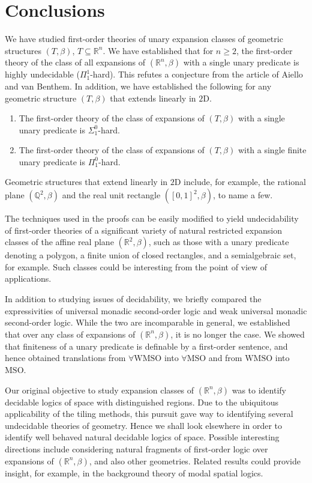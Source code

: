 \documentclass{LMCS}
\theoremstyle{plain}
\newcommand{\rp}{(\mathbb{R}^n,\beta)}
\newcommand{\rsq}{\mathbb{R}^n}
\begin{document}
\section{Conclusions}
%
%
%
We have studied first-order theories of unary expansion classes of 
%
geometric structures $(T,\beta)$, $T\subseteq\rsq$.
% 
We have established that for $n\geq 2$, the first-order theory of the class of all expansions of $\rp$ with a single unary
%
predicate is
%
highly undecidable ($\Pi_1^1$-hard). This refutes a conjecture from the article \cite{vanBenthemAiello:2002} of Aiello and van Benthem.
%
%
%
In addition, we have established the following for any geometric structure $(T,\beta)$ that extends linearly in $\mathrm{2D}$.
%
%
%
\begin{enumerate}
%
\item
The first-order theory of the class of expansions of $(T,\beta)$ with a single unary predicate is $\Sigma_1^0$-hard.
\item
The first-order theory of the class of expansions of $(T,\beta)$ with a single finite unary predicate is $\Pi_1^0$-hard.
%
\end{enumerate}
%
%
%
Geometric structures that extend linearly in $\mathrm{2D}$ include, for example, the rational plane $(\mathbb{Q}^2,\beta)$ and
%
the real unit
%
rectangle $([0,1]^2,\beta)$, to name a few.
%



%
The techniques used in the proofs can be easily modified to yield undecidability of first-order theories of a significant variety of
%
natural
%
restricted expansion classes of the affine real plane $(\mathbb{R}^2,\beta)$, such as those
%
with a unary predicate denoting a
%
 polygon, a finite union of closed rectangles, and a semialgebraic set, for example.
%
Such classes could be interesting from the point of view of applications.

In addition to studying issues of decidability, we briefly compared the expressivities of universal monadic second-order logic and
%
weak universal monadic second-order logic. While the two are incomparable in general, we established that over any class of
%
expansions of $\rp$, it is no longer the case. We showed that finiteness of a unary predicate is definable by a first-order sentence,
%
and hence obtained translations from $\forall\mathrm{WMSO}$ into $\forall\mathrm{MSO}$ and from $\mathrm{WMSO}$ into
%
$\mathrm{MSO}$.
%

Our original objective to study expansion classes of $\rp$ was to identify decidable logics of space with distinguished regions.
Due to the ubiquitous applicability of the tiling methods, this pursuit gave way to identifying several undecidable theories of geometry.
Hence we shall look elsewhere in order to identify well behaved natural decidable logics of space. Possible interesting directions include considering natural fragments of first-order logic over expansions of $\rp$, and also other geometries.
Related results could provide insight, for example, in the background theory of modal spatial logics.
\end{document}
